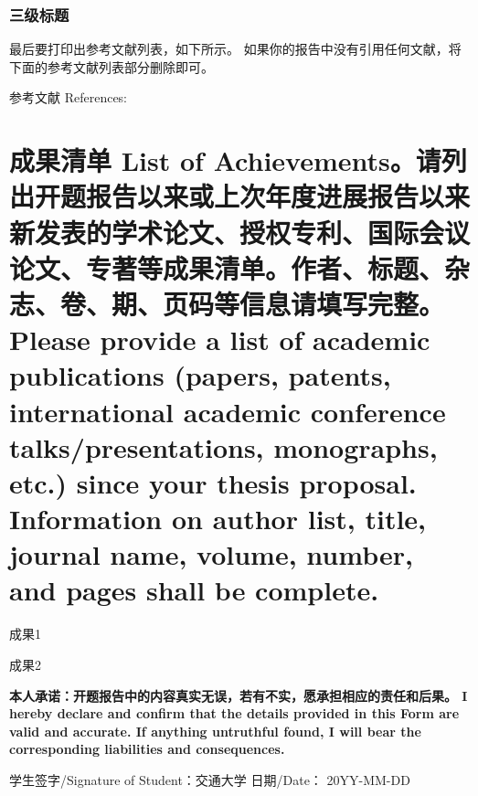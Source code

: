 \documentclass[a4paper,zihao=-4,AutoFakeBold]{ctexart}
\begin{document}
\subsubsection{三级标题}\label{subsub}

最后要打印出参考文献列表，如下所示。
如果你的报告中没有引用任何文献，将下面的参考文献列表部分删除即可。



\vspace{2\baselineskip}%
{%
    \linespread{1.25}\selectfont    %
    参考文献 References: 
    \printbibliography[heading=none]
}


\section{成果清单 List of Achievements。\mdseries 请列出开题报告以来或上次年度进展报告以来新发表的学术论文、授权专利、国际会议论文、专著等成果清单。作者、标题、杂志、卷、期、页码等信息请填写完整。Please provide a list of academic publications (papers, patents, international academic conference talks/presentations, monographs, etc.) since your thesis proposal. Information on author list, title, journal name, volume, number, and pages shall be complete.}

\begin{enumerate}[label={[\arabic*]}]
    \item 成果1
    \item 成果2
\end{enumerate}




\vspace{12pt}
\normalfont{}\bfseries\fangsong
本人承诺：开题报告中的内容真实无误，若有不实，愿承担相应的责任和后果。
I hereby declare and confirm that the details 
provided in this Form are valid and accurate. 
If anything untruthful found, 
I will bear the corresponding liabilities and consequences.

\vspace{\baselineskip}



\noindent
学生签字/Signature of Student：交通大学
\hfill              
日期/Date： 20YY-MM-DD
\end{document}
